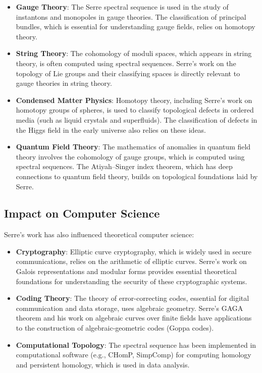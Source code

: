 \begin{itemize}
\item \textbf{Gauge Theory}: The Serre spectral sequence is used in the study of instantons and monopoles in gauge theories. The classification of principal bundles, which is essential for understanding gauge fields, relies on homotopy theory.

\item \textbf{String Theory}: The cohomology of moduli spaces, which appears in string theory, is often computed using spectral sequences. Serre's work on the topology of Lie groups and their classifying spaces is directly relevant to gauge theories in string theory.

\item \textbf{Condensed Matter Physics}: Homotopy theory, including Serre's work on homotopy groups of spheres, is used to classify topological defects in ordered media (such as liquid crystals and superfluids). The classification of defects in the Higgs field in the early universe also relies on these ideas.

\item \textbf{Quantum Field Theory}: The mathematics of anomalies in quantum field theory involves the cohomology of gauge groups, which is computed using spectral sequences. The Atiyah--Singer index theorem, which has deep connections to quantum field theory, builds on topological foundations laid by Serre.
\end{itemize}

\subsection{Impact on Computer Science}

Serre's work has also influenced theoretical computer science:

\begin{itemize}
\item \textbf{Cryptography}: Elliptic curve cryptography, which is widely used in secure communications, relies on the arithmetic of elliptic curves. Serre's work on Galois representations and modular forms provides essential theoretical foundations for understanding the security of these cryptographic systems.

\item \textbf{Coding Theory}: The theory of error-correcting codes, essential for digital communication and data storage, uses algebraic geometry. Serre's GAGA theorem and his work on algebraic curves over finite fields have applications to the construction of algebraic-geometric codes (Goppa codes).

\item \textbf{Computational Topology}: The spectral sequence has been implemented in computational software (e.g., CHomP, SimpComp) for computing homology and persistent homology, which is used in data analysis.
\end{itemize}

